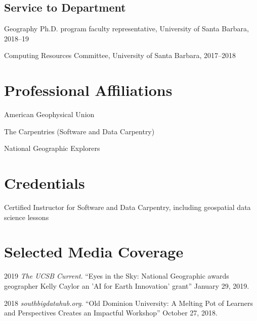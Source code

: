 \documentclass[12pt,letterpaper]{report}
\newcommand{\listitemspace}{0.15em}
\renewenvironment{itemize}
{\begin{list}{}{\setlength{\leftmargin}{0em}
			\setlength{\parskip}{0em}
			\setlength{\itemsep}{\listitemspace}
			\setlength{\parsep}{\listitemspace}}}
	{\end{list}}
\begin{document}
	\subsection*{Service to Department}
	
	\begin{itemize}
		
        \item Geography Ph.D. program faculty representative, University of Santa Barbara, 2018--19

		\item Computing Resources Committee, University of Santa Barbara, 2017--2018
		
	\end{itemize}
	
	
	
	\section*{Professional Affiliations}
	
	\begin{itemize}
		
		\item American Geophysical Union
		
		\item The Carpentries (Software and Data Carpentry)

                \item National Geographic Explorers
		
	\end{itemize}
	
	
	
	\section*{Credentials}
	
	\begin{itemize}
		
		\item Certified Instructor for Software and Data Carpentry, including geospatial data science lessons
		
	\end{itemize}
		
	
	
	\section*{Selected Media Coverage}
	
	\begin{tablist}
		
		\item 2019 \tab \textit{The UCSB Current}. \enquote{Eyes in the Sky: National Geographic awards geographer Kelly Caylor an 'AI for Earth Innovation' grant} January 29, 2019.
		
		\item 2018 \tab \textit{southbigdatahub.org}. \enquote{Old Dominion University: A Melting Pot of Learners and Perspectives Creates an Impactful Workshop} October 27, 2018.
				
	\end{tablist}
	
\end{document}

